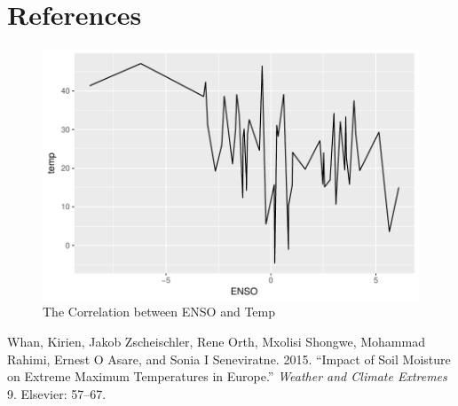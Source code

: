 \documentclass[]{article}
\begin{document}
\section{References}\label{references}

\begin{figure}
\centering
\includegraphics{example_files/figure-latex/makeplot-1.pdf}
\caption{The Correlation between ENSO and Temp}
\end{figure}

\hypertarget{refs}{}
\hypertarget{ref-whan2015impact}{}
Whan, Kirien, Jakob Zscheischler, Rene Orth, Mxolisi Shongwe, Mohammad
Rahimi, Ernest O Asare, and Sonia I Seneviratne. 2015. ``Impact of Soil
Moisture on Extreme Maximum Temperatures in Europe.'' \emph{Weather and
Climate Extremes} 9. Elsevier: 57--67.
\end{document}
